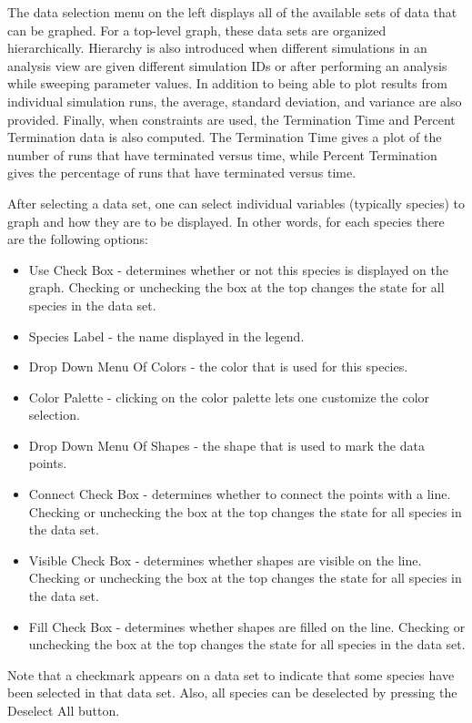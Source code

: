 \documentclass[titlepage,11pt]{article}
\begin{document}
The data selection menu on the left displays all of the available sets of data that can be graphed.  For a top-level graph, these data sets are organized hierarchically.  Hierarchy is also introduced when different simulations in an analysis view are given different simulation IDs or after performing an analysis while sweeping parameter values.  In addition to being able to plot results from individual simulation runs, the average, standard deviation, and variance are also provided.  Finally, when constraints are used, the Termination Time and Percent Termination data is also computed.  The Termination Time gives a plot of the number of runs that have terminated versus time, while Percent Termination gives the percentage of runs that have terminated versus time.

After selecting a data set, one can select individual variables (typically species) to graph and how they are to be displayed.  In other words, for each species there are the following options: 
\begin{itemize}
\item Use Check Box - determines whether or not this species is displayed on the graph.  Checking or unchecking the box at the top changes the state for all species in the data set. 
\item Species Label - the name displayed in the legend. 
\item Drop Down Menu Of Colors - the color that is used for this species. 
\item Color Palette - clicking on the color palette lets one customize the color selection. 
\item Drop Down Menu Of Shapes - the shape that is used to mark the data points. 
\item Connect Check Box - determines whether to connect the points with a line.  Checking or unchecking the box at the top changes the state for all species in the data set. 
\item Visible Check Box - determines whether shapes are visible on the line.  Checking or unchecking the box at the top changes the state for all species in the data set.
\item Fill Check Box - determines whether shapes are filled on the line.  Checking or  unchecking the box at the top changes the state for all species in the data set.
\end{itemize}
Note that a checkmark appears on a data set to indicate that some species have been selected in that data set. Also, all species can be deselected by pressing the Deselect All button.
\end{document}
